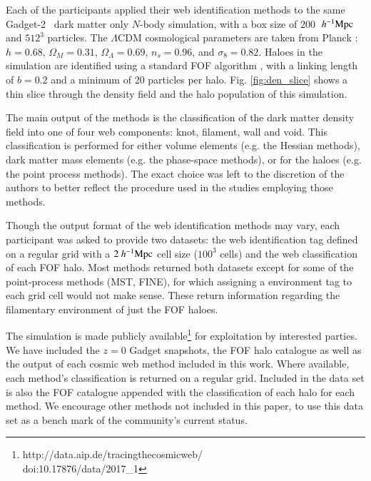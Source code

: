 \label{section:simulation}

Each of the participants applied their web identification methods to the same Gadget-2~\citep{2005MNRAS.364.1105S} dark matter only $N$-body simulation, with a box size of 200 $~h^{-1}\rm Mpc$ and $512^3$ particles. The $\Lambda$CDM cosmological parameters are taken from Planck \citep{2014A&A...571A..16P}: $h=0.68$, $\Omega_M = 0.31$, $\Omega_\Lambda = 0.69$, $n_s = 0.96$, and $\sigma_8 = 0.82$. Haloes in the simulation are identified using a standard FOF algorithm \citep{1985ApJ...292..371D}, with a linking length of $b=0.2$ and a minimum of 20 particles per halo. Fig. \ref{fig:den_slice} shows a thin slice through the density field and the halo population of this simulation.

The main output of the methods is the classification of the dark matter density field into one of four web components: knot, filament, wall and void. This classification is performed for either volume elements (e.g. the Hessian methods), dark matter mass elements (e.g. the phase-space methods), or for the haloes (e.g. the point process methods). The exact choice was left to the discretion of the authors to better reflect the procedure used in the studies employing those methods. 

Though the output format of the web identification methods may vary, each participant was asked to provide two datasets: the web identification tag defined on a regular grid with a $2~h^{-1}\rm Mpc$ cell size ($100^3$ cells) and the web classification of each FOF halo. Most methods returned both datasets except for some of the point-process methods (MST, FINE), for which assigning a environment tag to each grid cell would not make sense. These return information regarding the filamentary environment of just the FOF haloes.

The simulation is made publicly available\footnote{http://data.aip.de/tracingthecosmicweb/ \\  doi:10.17876/data/2017\_1} for exploitation by interested parties. We have included the $z=0$ Gadget snapshots, the FOF halo catalogue as well as the output of each cosmic web method included in this work. Where available, each method's classification is returned on a regular grid. Included in the data set is also the FOF catalogue appended with the classification of each halo for each method. We encourage other methods not included in this paper, to use this data set as a bench mark of the community's current status.


